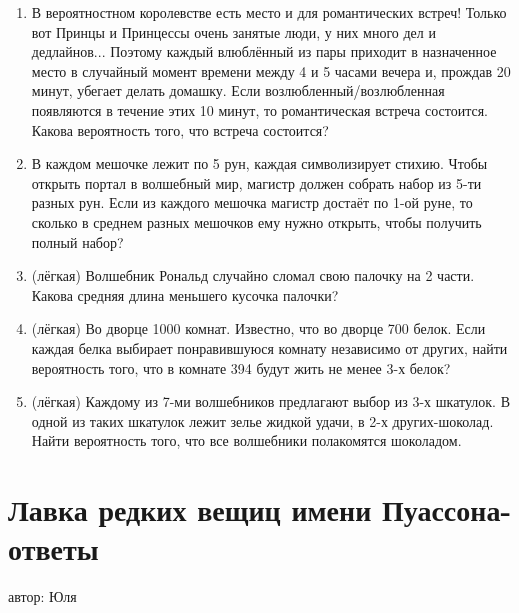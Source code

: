 \documentclass[a4paper,12pt]{article}
\begin{document}
\begin{enumerate} %
\item
В вероятностном королевстве есть место и для романтических встреч! Только вот Принцы и Принцессы очень занятые люди, у них много дел и дедлайнов... Поэтому каждый влюблённый из пары приходит в назначенное место в случайный момент времени между 4 и 5 часами вечера и, прождав 20 минут, убегает делать домашку. Если возлюбленный/возлюбленная появляются в течение этих 10 минут, то романтическая встреча состоится. Какова вероятность того, что встреча состоится?
\item
В каждом мешочке лежит по 5 рун, каждая символизирует стихию. Чтобы открыть портал в волшебный мир, магистр должен собрать набор из 5-ти разных рун. Если из каждого мешочка магистр достаёт по 1-ой руне, то сколько в среднем разных мешочков ему нужно открыть, чтобы получить полный набор?
\item (лёгкая)
Волшебник Рональд случайно сломал свою палочку на 2 части. Какова средняя длина меньшего кусочка палочки?
\item (лёгкая)
Во дворце 1000 комнат. Известно, что во дворце 700 белок. Если каждая белка выбирает понравившуюся комнату независимо от других, найти вероятность того, что в комнате 394 будут жить не менее 3-х белок?
\item (лёгкая)
Каждому из 7-ми волшебников предлагают выбор из 3-х шкатулок. В одной из таких шкатулок лежит зелье жидкой удачи, в 2-х других-шоколад. Найти вероятность того, что все волшебники полакомятся шоколадом.
\end{enumerate}

\newpage
\section{Лавка редких вещиц имени Пуассона-ответы}
автор: Юля
\end{document}

